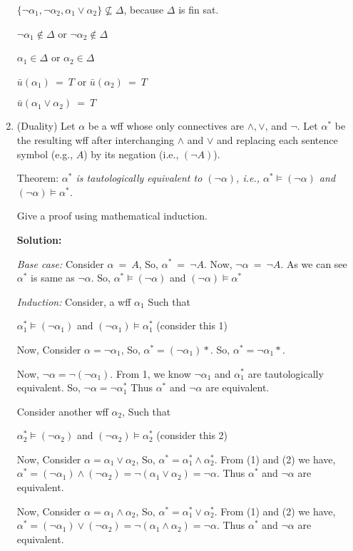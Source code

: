 \documentclass[12pt,letterpaper]{article}
\begin{document}
\begin{enumerate}
  $\{\lnot \alpha_{1}, \lnot \alpha_{2}, \alpha_{1} \lor \alpha_{2}\} \not\subseteq \Delta$, because $\Delta$ is fin sat.
  
  $\lnot \alpha_{1} \not\in \Delta$ or $ \lnot \alpha_{2} \not\in \Delta$
  
  $\alpha_{1} \in \Delta$ or $ \alpha_{2} \in \Delta$
   
 $\bar{u}(\alpha_{1})\ =\ T$ or $\bar{u}(\alpha_{2})\ =\ T$ 
 
 $\bar{u}(\alpha_{1} \lor \alpha_{2})\ =\ T$ 

\item 
  (Duality)
  Let $\alpha$ be a wff whose only connectives are $\land,\lor$,
  and $\neg$.
  Let $\alpha^*$ be the resulting wff after interchanging $\land$
  and $\lor$ and replacing each sentence symbol (e.g., $A$) by its
  negation (i.e., $(\neg A)$).
  
  {\sc Theorem:}
  {\em $\alpha^*$ is tautologically equivalent to $(\neg
    \alpha)$, i.e., $\alpha^*\models (\neg\alpha)$ and 
    $(\neg\alpha)\models\alpha^*$.}

  Give a proof using mathematical induction.
  
  \textbf{Solution:}
  
  \textit{Base case:} Consider $\alpha\ =\ A$, So, $\alpha^*\ =\ \lnot A$. Now, $\lnot \alpha\ =\ \lnot A$. As we can see $\alpha^*$ is same as $\lnot \alpha$. So, $\alpha^*\models (\neg\alpha)$ and $(\neg\alpha)\models\alpha^*$
  
  \textit{Induction:} Consider, a wff $\alpha_{1}$ Such that 
  
  $\alpha_{1}^*\models (\neg\alpha_{1})$ and $(\neg\alpha_{1})\models\alpha_{1}^*$  (consider this 1)
  
  Now, Consider $\alpha = \lnot \alpha_{1}$, So, $\alpha^{*} = (\lnot \alpha_{1})*$. So, $\alpha^{*} = \lnot \alpha_{1}*$. 
  
  Now, $\lnot \alpha = \lnot(\lnot \alpha_{1})$. From 1, we know $\lnot \alpha_{1}$ and $\alpha_{1}^{*}$ are tautologically equivalent. So, $\lnot \alpha = \lnot \alpha_{1}^{*}$
  Thus $\alpha^{*}$ and $\lnot \alpha$ are equivalent.

  Consider another wff $\alpha_{2}$, Such that 
  
  $\alpha_{2}^*\models (\neg\alpha_{2})$ and $(\neg\alpha_{2})\models\alpha_{2}^*$  (consider this 2)
  
  Now, Consider $\alpha = \alpha_{1} \lor \alpha_{2}$, So, $\alpha^{*} = \alpha_{1}^{*} \land \alpha_{2}^{*}$. From (1) and (2) we have, $\alpha^{*} = (\neg\alpha_{1}) \land (\neg\alpha_{2}) = \neg( \alpha_{1} \lor \alpha_{2}) = \neg\alpha$. Thus $\alpha^{*}$ and $\lnot \alpha$ are equivalent.
  
   Now, Consider $\alpha = \alpha_{1} \land \alpha_{2}$, So, $\alpha^{*} = \alpha_{1}^{*} \lor \alpha_{2}^{*}$. From (1) and (2) we have, $\alpha^{*} = (\neg\alpha_{1}) \lor (\neg\alpha_{2}) = \neg( \alpha_{1} \land \alpha_{2}) = \neg\alpha$. Thus $\alpha^{*}$ and $\lnot \alpha$ are equivalent.
\end{enumerate}
\end{document}
